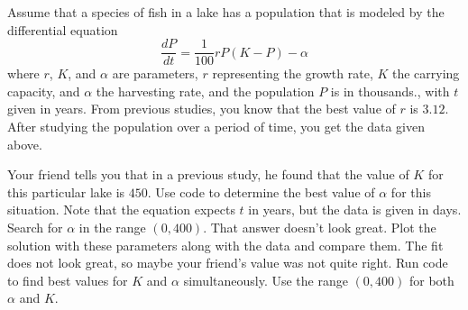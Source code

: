 \documentclass{ximera}
\begin{document}
\begin{exercise}\label{ex:ModelingParamPop}
    Assume that a species of fish in a lake has a population that is modeled by the differential equation
    \begin{equation*}
        \frac{dP}{dt} = \frac{1}{100}rP(K - P) - \alpha 
    \end{equation*}
    where $r$, $K$, and $\alpha$ are parameters, $r$ representing the growth rate, $K$ the carrying capacity, and $\alpha$ the harvesting rate, and the population $P$ is in thousands., with $t$ given in years. From previous studies, you know that the best value of $r$ is $3.12$. After studying the population over a period of time, you get the data given above.
    \begin{tasks}
        \task Your friend tells you that in a previous study, he found that the value of $K$ for this particular lake is $450$. Use code to determine the best value of $\alpha$ for this situation. Note that the equation expects $t$ in years, but the data is given in days. Search for $\alpha$ in the range $(0, 400)$.
        \task That answer doesn't look great. Plot the solution with these parameters along with the data and compare them.
        \task The fit does not look great, so maybe your friend's value was not quite right. Run code to find best values for $K$ and $\alpha$ simultaneously. Use the range $(0, 400)$ for both $\alpha$ and $K$.
    \end{tasks}

\end{exercise}
\end{document}
